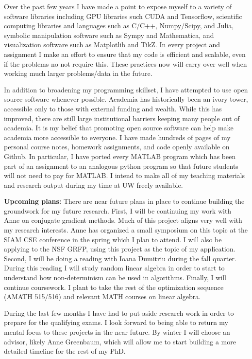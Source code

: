 \documentclass[11pt]{article}
\begin{document}
Over the past few years I have made a point to expose myself to a variety of software libraries including GPU libraries such CUDA and Tensorflow, scientific computing libraries and languages such as C/C++, Numpy/Scipy, and Julia, symbolic manipulation software such as Sympy and Mathematica, and visualization software such as Matplotlib and TikZ. In every project and assignment I make an effort to ensure that my code is efficient and scalable, even if the problems no not require this. These practices now will carry over well when working much larger problems/data in the future.

In addition to broadening my programming skillset, I have attempted to use open source software whenever possible. 
Academia has historically been an ivory tower, accessible only to those with external funding and wealth. While this has improved, there are still large institutional barriers keeping many people out of academia. It is my belief that promoting open source software can help make academia more accessible to everyone.
I have made hundreds of pages of my personal course notes, homework assignments, and code openly available on Github. In particular, I have ported every MATLAB program which has been part of an assignment to an analogous python program so that future students will not need to pay for MATLAB. 
I intend to make all of my teaching materials and research output during my time at UW freely available.


\textbf{Upcoming plans:}
There are near future plans in place to continue building the groundwork for my future research. First, I will be continuing my work with Anne on conjugate gradient methods. Much of this project aligns very well with my research interests. Anne has organized a small symposium on this topic at the SIAM CSE conference in the spring which I plan to attend. I will also be applying to the NSF GRFP, using this project as the topic of my application.
Second, I will be doing a reading with Ioana Dumitriu during the fall quarter.
During this reading I will study random linear algebra in order to start to understand how non-determinism can be used in algorithms. 
Finally, I will continue coursework. I plant to take the rest of the optimization sequence (AMATH 515/516) and relevant MATH courses on linear algebra.


During the last few months I have had to put aside research work in order to prepare for the qualifying exams. I look forward to being able to return my mental focus to these projects in the near future. 
By winter I will choose an advisor, likely Anne Greenbaum, which will allow me to start building a more detailed timeline for the rest of my PhD.






\end{document}
